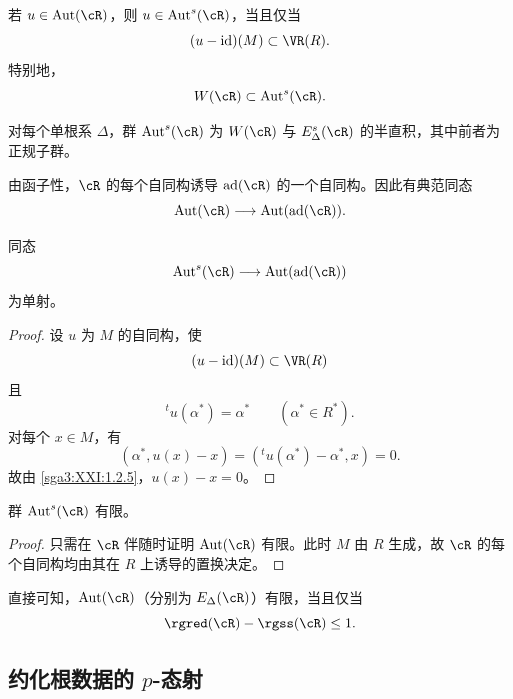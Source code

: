 \begin{remark}\label{sga3:XXI:6.7.4}
若 \(u\in\operatorname{Aut}(\cR)\)，则 \(u\in\operatorname{Aut}^{s}(\cR)\)，当且仅当
\[
 (u-\operatorname{id})(M)\subset\VR(R).
\]
特别地，
\[
 W(\cR)\subset\operatorname{Aut}^{s}(\cR).
\]
\end{remark}

\begin{proposition}\label{sga3:XXI:6.7.5}
对每个单根系 \(\Delta\)，群 \(\operatorname{Aut}^{s}(\cR)\) 为 \(W(\cR)\) 与 \(E_\Delta^{s}(\cR)\) 的半直积，其中前者为正规子群。
\end{proposition}

由函子性，\(\cR\) 的每个自同构诱导 \(\operatorname{ad}(\cR)\) 的一个自同构。因此有典范同态
\[
 \operatorname{Aut}(\cR)\longrightarrow
 \operatorname{Aut}(\operatorname{ad}(\cR)).
\]

\begin{lemma}\label{sga3:XXI:6.7.6}
同态
\[
 \operatorname{Aut}^{s}(\cR)\longrightarrow
 \operatorname{Aut}(\operatorname{ad}(\cR))
\]
为单射。
\end{lemma}

\begin{proof}
设 \(u\) 为 \(M\) 的自同构，使
\[
 (u-\operatorname{id})(M)\subset\VR(R)
\]
且
\[
 {}^tu(\alpha^\ast)=\alpha^\ast
 \qquad(\alpha^\ast\in R^\ast).
\]
对每个 \(x\in M\)，有
\[
 (\alpha^\ast,u(x)-x)
 =({}^tu(\alpha^\ast)-\alpha^\ast,x)=0.
\]
故由 \ref{sga3:XXI:1.2.5}，\(u(x)-x=0\)。
\end{proof}

\begin{lemma}\label{sga3:XXI:6.7.7}
群 \(\operatorname{Aut}^{s}(\cR)\) 有限。
\end{lemma}

\begin{proof}
只需在 \(\cR\) 伴随时证明 \(\operatorname{Aut}(\cR)\) 有限。此时 \(M\) 由 \(R\) 生成，故 \(\cR\) 的每个自同构均由其在 \(R\) 上诱导的置换决定。
\end{proof}

\begin{remark}\label{sga3:XXI:6.7.8}
直接可知，\(\operatorname{Aut}(\cR)\)（分别为 \(E_\Delta(\cR)\)）有限，当且仅当
\[
 \rgred(\cR)-\rgss(\cR)\leq1.
\]
\end{remark}

\subsection{约化根数据的 \(p\)-态射}
\label{sga3:XXI:6.8}

